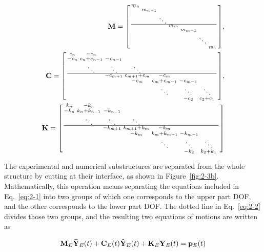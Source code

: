 \begin{equation}\label{eq:2-2}
\begin{aligned}
\mathbf{M} = \begin{bsmallmatrix} m_{n}&&&&&&\\&m_{n-1}&&&&&\\&&\ddots&&&&\\ \hline&&&m_{m}&&&\\&&&&m_{m-1}&&\\&&&&&\ddots&\\&&&&&&m_{1} \end{bsmallmatrix},\\
\mathbf{C} = \begin{bsmallmatrix} c_{n}&-c_{n}&&&&&\\-c_{n}&c_{n}+c_{n-1}&-c_{n-1}&&&&\\&\ddots&\ddots&\ddots&&&\\\hline&&-c_{m+1}&c_{m+1}+c_{m}&-c_{m}&&\\&&&-c_{m}&c_{m}+c_{m-1}&-c_{m-1}&\\&&&&\ddots&\ddots&\ddots&\\&&&&&-c_{2}&c_{2}+c_{1} \end{bsmallmatrix},\\
\mathbf{K} = \begin{bsmallmatrix} k_{n}&-k_{n}&&&&&\\-k_{n}&k_{n}+k_{n-1}&-k_{n-1}&&&&\\&\ddots&\ddots&\ddots&&&\\\hline&&-k_{m+1}&k_{m+1}+k_{m}&-k_{m}&&\\&&&-k_{m}&k_{m}+k_{m-1}&-k_{m-1}&\\&&&&\ddots&\ddots&\ddots&\\&&&&&-k_{2}&k_{2}+k_{1} \end{bsmallmatrix}
\end{aligned}
\end{equation}

The experimental and numerical substructures are separated from the whole structure by cutting at their interface, as shown in Figure~\ref{fig:2-3b}. Mathematically, this operation means separating the equations included in Eq.~\eqref{eq:2-1} into two groups of which one corresponds to the upper part DOF, and the other corresponds to the lower part DOF. The dotted line in Eq.~\eqref{eq:2-2} divides those two groups, and the resulting two equations of motions are written as

\begin{equation}\label{eq:2-3}
\mathbf{M}_{E}\mathbf{\ddot{Y}}_{E}(t)+\mathbf{C}_{E}(t)\mathbf{\dot{Y}}_{E}(t)+\mathbf{K}_{E}\mathbf{Y}_{E}(t) = \mathbf{p}_{E}(t)
\end{equation}


